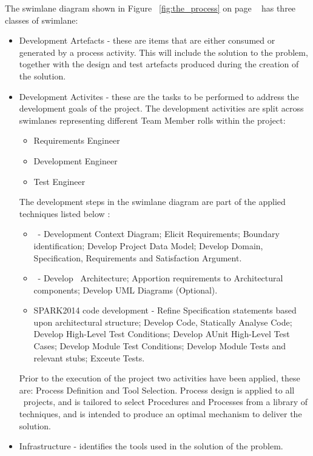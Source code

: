 The swimlane diagram shown in Figure ~\ref{fig:the_process} on page
~\pageref{fig:the_process} has three classes of swimlane:

\begin{itemize}

   \item Development Artefacts - these are items that are either consumed or generated by
         a process activity. This will include the solution to the problem, together with
         the design and test artefacts produced during the creation of the solution.

   \item Development Activites - these are the tasks to be performed to address the
         development goals of the project. The development activities are split across
         swimlanes representing different Team Member rolls within the project:

         \begin{itemize}
            \item Requirements Engineer
            \item Development Engineer
            \item Test Engineer
         \end{itemize}

    The development steps in the swimlane diagram are part of the applied techniques
    listed below :

         \begin{itemize}
            \item \reveal\ - Development Context Diagram; Elicit Requirements; Boundary
            identification; Develop Project Data Model; Develop Domain, Specification,
            Requirements and Satisfaction Argument.
            \item \informed\ - Develop \informed\ Architecture; Apportion requirements to
            Architectural components; Develop UML Diagrams (Optional).
            \item SPARK2014 code development - Refine Specification statements based upon
            architectural structure; Develop Code, Statically Analyse Code; Develop
            High-Level Test Conditions; Develop AUnit High-Level Test Cases; Develop Module
            Test Conditions; Develop Module Tests and relevant stubs; Exceute Tests.
         \end{itemize}

    Prior to the execution of the project two activities have been applied, these are: Process
    Definition and Tool Selection.  Process design is applied to all \altran\ projects, and is
    tailored to select Procedures and Processes from a library of techniques, and is intended
    to produce an optimal mechanism to deliver the solution.

    \item Infrastructure - identifies the tools used in the solution of the problem.
\end{itemize}

